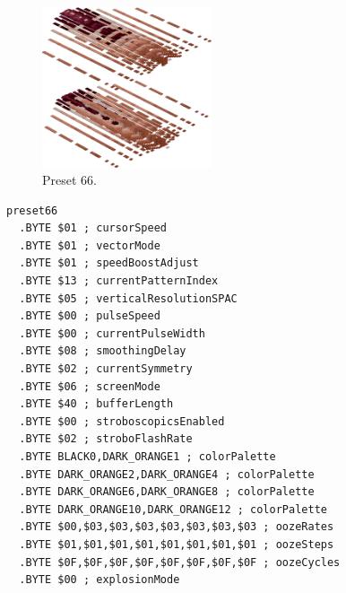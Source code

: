 \clearpage
\begin{minipage}[b]{0.48\linewidth}
\begin{figure}[H]                                                          
  \centering                                                             
  \begin{adjustbox}{width=5cm,center}                                   
  \includegraphics[width=5cm]{src/colorspace_presets/preset66-45.png}%
  \end{adjustbox}                                                        
\caption*{Preset 66.}                                           
\end{figure}                                                               
\end{minipage}
\hspace{0.1cm}
\begin{minipage}[b]{0.48\linewidth}                            
\begin{lstlisting}[basicstyle=\ttfamily\tiny]
preset66
  .BYTE $01 ; cursorSpeed
  .BYTE $01 ; vectorMode
  .BYTE $01 ; speedBoostAdjust
  .BYTE $13 ; currentPatternIndex
  .BYTE $05 ; verticalResolutionSPAC
  .BYTE $00 ; pulseSpeed
  .BYTE $00 ; currentPulseWidth
  .BYTE $08 ; smoothingDelay
  .BYTE $02 ; currentSymmetry
  .BYTE $06 ; screenMode
  .BYTE $40 ; bufferLength
  .BYTE $00 ; stroboscopicsEnabled
  .BYTE $02 ; stroboFlashRate
  .BYTE BLACK0,DARK_ORANGE1 ; colorPalette
  .BYTE DARK_ORANGE2,DARK_ORANGE4 ; colorPalette
  .BYTE DARK_ORANGE6,DARK_ORANGE8 ; colorPalette
  .BYTE DARK_ORANGE10,DARK_ORANGE12 ; colorPalette
  .BYTE $00,$03,$03,$03,$03,$03,$03,$03 ; oozeRates
  .BYTE $01,$01,$01,$01,$01,$01,$01,$01 ; oozeSteps
  .BYTE $0F,$0F,$0F,$0F,$0F,$0F,$0F,$0F ; oozeCycles
  .BYTE $00 ; explosionMode
\end{lstlisting}
\end{minipage}

\vspace*{0.3cm}

